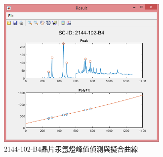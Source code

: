 \begin{figure}[H] %
	\centering %
	\vspace{0.8cm}
	\includegraphics[width=0.74\textwidth]{figures/Result/比較/B4.jpg} %
	\caption{2144-102-B4晶片汞氬燈峰值偵測與擬合曲線} %
	\label{B4晶片汞氬燈峰值偵測與擬合曲線} %
\end{figure}

